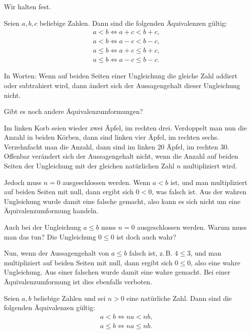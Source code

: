 Wir halten fest. 

\begin{Satz}
Seien $a,b,c$ beliebige Zahlen. Dann sind die folgenden
Äquivalenzen gültig:
\begin{gather}
\label{lt-add} a<b\iff a+c<b+c,\\
\label{lt-sub} a<b\iff a-c<b-c,\\
\label{le-add} a\le b\iff a+c\le b+c,\\
\label{le-sub} a\le b\iff a-c\le b-c.
\end{gather}
\end{Satz}

\noindent
In Worten: Wenn auf beiden Seiten einer Ungleichung die gleiche
Zahl addiert oder subtrahiert wird, dann ändert sich der Aussagengehalt
dieser Ungleichung nicht.

Gibt es noch andere Äquivalenzumformungen?

Im linken Korb seien wieder zwei Äpfel, im rechten drei. Verdoppelt
man nun die Anzahl in beiden Körben, dann sind linken vier Äpfel,
im rechten sechs. Verzehnfacht man die Anzahl, dann sind im linken
20 Äpfel, im rechten 30. Offenbar verändert sich der Aussagengehalt
nicht, wenn die Anzahl auf beiden Seiten der Ungleichung mit
der gleichen natürlichen Zahl $n$ multipliziert wird.

Jedoch muss $n=0$ ausgeschlossen werden. Wenn $a<b$ ist, und man
multipliziert auf beiden Seiten mit null, dann ergibt sich
$0<0$, was falsch ist. Aus der wahren Ungleichung wurde damit eine
falsche gemacht, also kann es sich nicht um eine Äquivalenzumformung
handeln.

Auch bei der Ungleichung $a\le b$ muss $n=0$ ausgeschlossen werden.
Warum muss man das tun? Die Ungleichung $0\le 0$ ist doch auch
wahr?

Nun, wenn der Aussagengehalt von $a\le b$ falsch ist, z.\,B. $4\le 3$,
und man multipliziert auf beiden Seiten mit null, dann ergibt sich
$0\le 0$, also eine wahre Ungleichung. Aus einer falschen wurde damit
eine wahre gemacht. Bei einer Äquivalenzumformung ist dies ebenfalls
verboten.

\begin{Satz}
Seien $a,b$ beliebige Zahlen und sei $n>0$ eine natürliche Zahl.
Dann sind die folgenden Äquivalenzen gültig:
\begin{gather}
\label{lt-mul-nat} a<b\iff na<nb,\\
\label{le-mul-nat} a\le b\iff na\le nb.
\end{gather}
\end{Satz}

